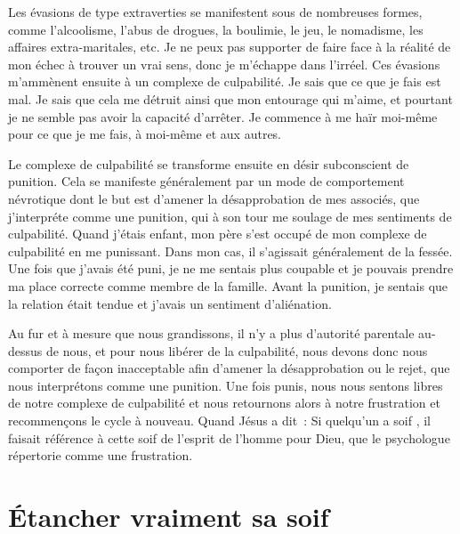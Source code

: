 \begin{specialpar}{}
Les évasions de type extraverties se manifestent sous de nombreuses formes,
 comme l'alcoolisme, l'abus de drogues, la boulimie, le jeu, le nomadisme,
 les affaires extra-maritales, etc.
 Je ne peux pas supporter de faire face à la réalité de mon échec à trouver
 un vrai sens, donc je m'échappe dans l'irréel.
 Ces évasions m'ammènent ensuite à un complexe de culpabilité.
 Je sais que ce que je fais est mal. Je sais que cela me détruit
 ainsi que mon entourage qui m'aime, et pourtant je ne semble pas avoir
 la capacité d'arrêter. Je commence à me haïr moi-même pour ce que je me fais,
 à moi-même et aux autres.
\end{specialpar}

Le complexe de culpabilité se transforme ensuite en désir subconscient
 de punition. Cela se manifeste généralement par un mode de comportement
 névrotique dont le but est d'amener la désapprobation de mes associés,
 que j'interpréte comme une punition, qui à son tour me soulage
 de mes sentiments de culpabilité. Quand j'étais enfant, mon père
 s'est occupé de mon complexe de culpabilité en me punissant.
 Dans mon cas, il s'agissait généralement de la fessée.
 Une fois que j'avais été puni, je ne me sentais plus coupable
 et je pouvais prendre ma place correcte comme membre de la famille.
 Avant la punition, je sentais que la relation était tendue et j'avais
 un sentiment d'aliénation.

Au fur et à mesure que nous grandissons, il n'y a plus d'autorité parentale
 au-dessus de nous, et pour nous libérer de la culpabilité, nous devons donc
 nous comporter de façon inacceptable afin d'amener la désapprobation
 ou le rejet, que nous interprétons comme une punition.
 Une fois punis, nous nous sentons libres de notre complexe de culpabilité
 et nous retournons alors à notre frustration et recommençons le cycle
 à nouveau. Quand Jésus a dit~: \og Si quelqu'un a soif \fg{},
 il faisait référence à cette soif de l'esprit de l'homme pour Dieu,
 que le psychologue répertorie comme une frustration.


\section*{Étancher vraiment sa soif}

